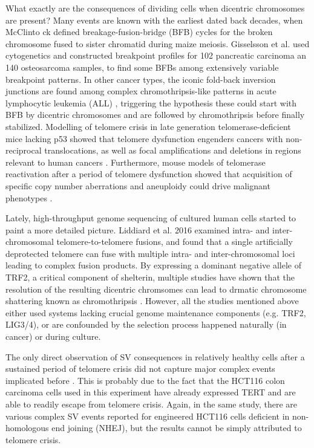 \documentclass[phd,tocprelim]{cornell}
\begin{document}
What exactly are the consequences of dividing cells when dicentric chromosomes are present? Many events are known with the earliest dated back decades, when McClinto
ck \cite{McClintock1939-oi} defined breakage-fusion-bridge (BFB) cycles for the broken chromosome fused to sister chromatid during maize meiosis. Gisselsson et al. \cite{Gisselsson2001-hq} used cytogenetics and constructed breakpoint profiles for 102 pancreatic carcinoma an 140 osteosarcoma samples, to find some BFBs among extensively variable breakpoint patterns. In other cancer types, the iconic fold-back inversion junctions are found among complex chromothripsis-like patterns in acute lymphocytic leukemia (ALL) \cite{Li2014-mj}, triggering the hypothesis these could start with BFB by dicentric chromosomes and are followed by chromothripsis before finally stabilized. Modelling of telomere crisis in late generation telomerase-deficient mice lacking p53 showed that telomere dysfunction engenders cancers with non-reciprocal translocations, as well as focal amplifications and deletions in regions relevant to human cancers \cite{Artandi2000-ab,OHagan2002-rg}. Furthermore, mouse models of telomerase reactivation after a period of telomere dysfunction showed that acquisition of specific copy number aberrations and aneuploidy could drive malignant phenotypes \cite{Ding2012-at}.

Lately, high-throughput genome sequencing of cultured human cells started to paint a more detailed picture. Liddiard et al. 2016 \cite{Liddiard2016-ay} examined intra- and inter-chromosomal telomere-to-telomere fusions, and found that a single artificially deprotected telomere can fuse with multiple intra- and inter-chromosomal loci leading to complex fusion products. By expressing a dominant negative allele of TRF2, a critical component of shelterin, multiple studies have shown that the resolution of the resulting dicentric chromsomes can lead to drmatic chromosome shattering known as chromothripsis \cite{maciejowski2015,Umbreit2020-kr,Maciejowski2020-bw}. However, all the studies mentioned above either used systems lacking crucial genome maintenance components (e.g. TRF2, LIG3/4), or are confounded by the selection process happened naturally (in cancer) or during culture.

The only direct observation of SV consequences in relatively healthy cells after a sustained period of telomere crisis did not capture major complex events implicated before \cite{Cleal2019-dk}. This is probably due to the fact that the HCT116 colon carcinoma cells used in this experiment have already expressed TERT and are able to readily escape from telomere crisis. Again, in the same study, there are various complex SV events reported for engineered HCT116 cells deficient in non-homologous end joining (NHEJ), but the results cannot be simply attributed to telomere crisis.
\end{document}
